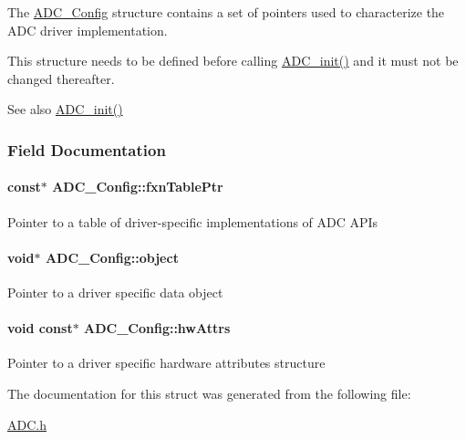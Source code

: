 The \hyperlink{struct_a_d_c___config}{A\+D\+C\+\_\+\+Config} structure contains a set of pointers used to characterize the A\+D\+C driver implementation.

This structure needs to be defined before calling \hyperlink{_a_d_c_8h_a4b4a2ddcb45df0c8497c47d4ed800e2a}{A\+D\+C\+\_\+init()} and it must not be changed thereafter.

\begin{DoxySeeAlso}{See also}
\hyperlink{_a_d_c_8h_a4b4a2ddcb45df0c8497c47d4ed800e2a}{A\+D\+C\+\_\+init()} 
\end{DoxySeeAlso}


\subsubsection{Field Documentation}
\paragraph[{fxn\+Table\+Ptr}]{ const$\ast$ A\+D\+C\+\_\+\+Config\+::fxn\+Table\+Ptr}\label{struct_a_d_c___config_a3ca1098e17a4748a0f6dc64382cea00d}
Pointer to a table of driver-\/specific implementations of A\+D\+C A\+P\+Is 
\paragraph[{object}]{\setlength{\rightskip}{0pt plus 5cm}void$\ast$ A\+D\+C\+\_\+\+Config\+::object}\label{struct_a_d_c___config_acf3784052a071ffab8a3f1dd9b334c02}
Pointer to a driver specific data object 
\paragraph[{hw\+Attrs}]{\setlength{\rightskip}{0pt plus 5cm}void const$\ast$ A\+D\+C\+\_\+\+Config\+::hw\+Attrs}\label{struct_a_d_c___config_a485e9d57b2d43a4b7dde68972f88dd2b}
Pointer to a driver specific hardware attributes structure 

The documentation for this struct was generated from the following file\+:\begin{DoxyCompactItemize}
\item 
\hyperlink{_a_d_c_8h}{A\+D\+C.\+h}\end{DoxyCompactItemize}
